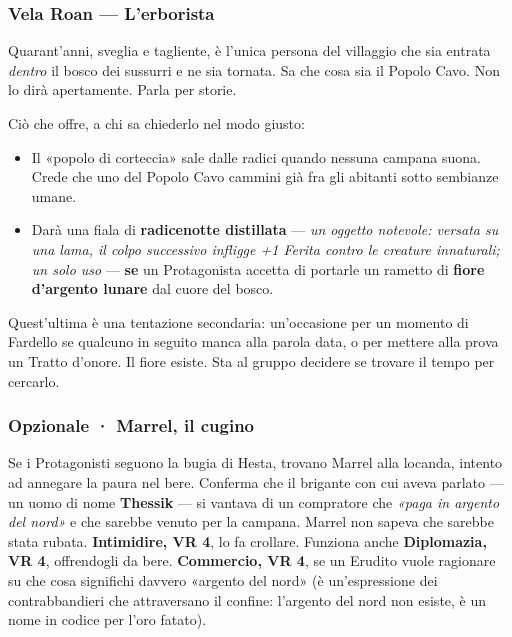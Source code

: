 \documentclass[10pt,a4paper]{article}
\newcommand{\tightlist}{\setlength{\itemsep}{0pt}\setlength{\parskip}{0pt}}
\begin{document}
\subsubsection{Vela Roan --- L'erborista}\label{vela-roan-lerborista}

Quarant'anni, sveglia e tagliente, è l'unica persona del villaggio che sia entrata \emph{dentro} il bosco dei sussurri e ne sia tornata. Sa che cosa sia il Popolo Cavo. Non lo dirà apertamente. Parla per storie.

Ciò che offre, a chi sa chiederlo nel modo giusto:

\begin{itemize}
\tightlist
\item
  Il «popolo di corteccia» sale dalle radici quando nessuna campana suona. Crede che uno del Popolo Cavo cammini già fra gli abitanti sotto sembianze umane.
\item
  Darà una fiala di \textbf{radicenotte distillata} --- \emph{un oggetto notevole: versata su una lama, il colpo successivo infligge +1 Ferita contro le creature innaturali; un solo uso} --- \textbf{se} un Protagonista accetta di portarle un rametto di \textbf{fiore d'argento lunare} dal cuore del bosco.
\end{itemize}

Quest'ultima è una tentazione secondaria: un'occasione per un momento di Fardello se qualcuno in seguito manca alla parola data, o per mettere alla prova un Tratto d'onore. Il fiore esiste. Sta al gruppo decidere se trovare il tempo per cercarlo.

\subsubsection{Opzionale · Marrel, il cugino}\label{opzionale-marrel-il-cugino}

Se i Protagonisti seguono la bugia di Hesta, trovano Marrel alla locanda, intento ad annegare la paura nel bere. Conferma che il brigante con cui aveva parlato --- un uomo di nome \textbf{Thessik} --- si vantava di un compratore che \emph{«paga in argento del nord»} e che sarebbe venuto per la campana. Marrel non sapeva che sarebbe stata rubata. \textbf{Intimidire, VR 4}, lo fa crollare. Funziona anche \textbf{Diplomazia, VR 4}, offrendogli da bere. \textbf{Commercio, VR 4}, se un Erudito vuole ragionare su che cosa significhi davvero «argento del nord» (è un'espressione dei contrabbandieri che attraversano il confine: l'argento del nord non esiste, è un nome in codice per l'oro fatato).
\end{document}
